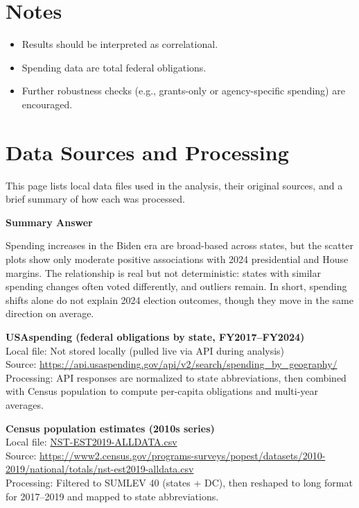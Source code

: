 \documentclass[
  11pt,
]{article}
\providecommand{\tightlist}{%
  \setlength{\itemsep}{0pt}\setlength{\parskip}{0pt}}
\begin{document}
\section{Notes}\label{notes}

\begin{itemize}
\tightlist
\item
  Results should be interpreted as correlational.
\item
  Spending data are total federal obligations.
\item
  Further robustness checks (e.g., grants-only or agency-specific
  spending) are encouraged.
\end{itemize}

\section{Data Sources and Processing}\label{data-sources-and-processing}

This page lists local data files used in the analysis, their original
sources, and a brief summary of how each was processed.

\textbf{Summary Answer}

Spending increases in the Biden era are broad-based across states, but
the scatter plots show only moderate positive associations with 2024
presidential and House margins. The relationship is real but not
deterministic: states with similar spending changes often voted
differently, and outliers remain. In short, spending shifts alone do not
explain 2024 election outcomes, though they move in the same direction
on average.

\textbf{USAspending (federal obligations by state, FY2017--FY2024)}\\
Local file: Not stored locally (pulled live via API during analysis)\\
Source:
\url{https://api.usaspending.gov/api/v2/search/spending_by_geography/}\\
Processing: API responses are normalized to state abbreviations, then
combined with Census population to compute per-capita obligations and
multi-year averages.

\textbf{Census population estimates (2010s series)}\\
Local file: \url{NST-EST2019-ALLDATA.csv}\\
Source:
\url{https://www2.census.gov/programs-surveys/popest/datasets/2010-2019/national/totals/nst-est2019-alldata.csv}\\
Processing: Filtered to SUMLEV 40 (states + DC), then reshaped to long
format for 2017--2019 and mapped to state abbreviations.
\end{document}
